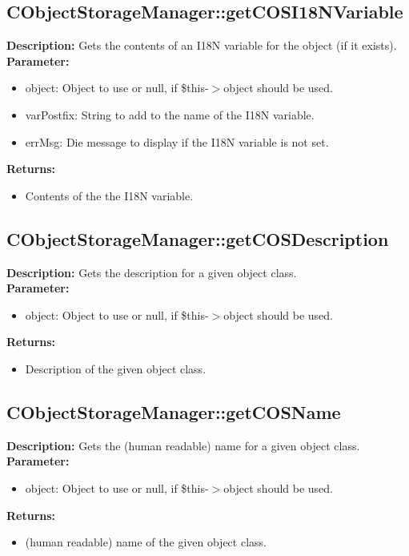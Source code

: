\subsection{CObjectStorageManager::getCOSI18NVariable}
\textbf{Description:} Gets the contents of an I18N variable for the object (if it exists).\\
\textbf{Parameter:}
\begin{itemize}
\item object: Object to use or null, if \$this-$>$object should be used.
\item varPostfix: String to add to the name of the I18N variable.
\item errMsg: Die message to display if the I18N variable is not set.
\end{itemize}
\textbf{Returns:}
\begin{itemize}
\item Contents of the the I18N variable.
\end{itemize}

\subsection{CObjectStorageManager::getCOSDescription}
\textbf{Description:} Gets the description for a given object class.\\
\textbf{Parameter:}
\begin{itemize}
\item object: Object to use or null, if \$this-$>$object should be used.
\end{itemize}
\textbf{Returns:}
\begin{itemize}
\item Description of the given object class.
\end{itemize}

\subsection{CObjectStorageManager::getCOSName}
\textbf{Description:} Gets the (human readable) name for a given object class.\\
\textbf{Parameter:}
\begin{itemize}
\item object: Object to use or null, if \$this-$>$object should be used.
\end{itemize}
\textbf{Returns:}
\begin{itemize}
\item (human readable) name of the given object class.
\end{itemize}

